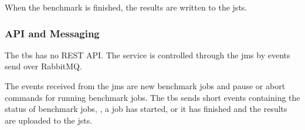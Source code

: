 When the benchmark is finished, the results are written to the \acf{jsts}.

\subsubsection{API and Messaging}
\label{sec:benchmarking_api}
The \ac{tbs} has no REST API.
The service is controlled through the \ac{jms} by events send over RabbitMQ.

The events received from the \ac{jms} are new benchmark jobs and pause or abort commands for running benchmark jobs.
The \ac{tbs} sends short events containing the status of benchmark jobs, \eg, a job has started, or it has finished and the results are uploaded to the \acl{jsts}.